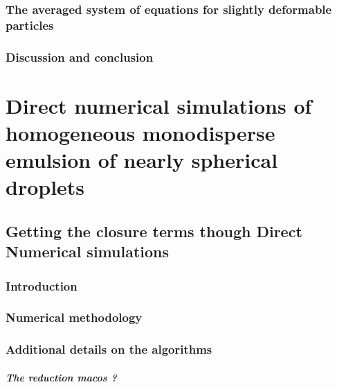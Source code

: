 \documentclass[12pt,a4paper,openany]{My_book}
\begin{document}
\section{The averaged system of equations for slightly deformable particles}
\label{sec:averaged_eq}





\section{Discussion and conclusion}

   

\part{Direct numerical simulations of homogeneous monodisperse emulsion of nearly spherical droplets}

\chapter{Getting the closure terms though Direct Numerical simulations}
\label{chap:DNS}
\localtableofcontents

\section{Introduction}



\section{Numerical methodology}
\label{sec:methodo}






\section{Additional details on the algorithms}


\subsubsection{The reduction macos ? }
\end{document}
